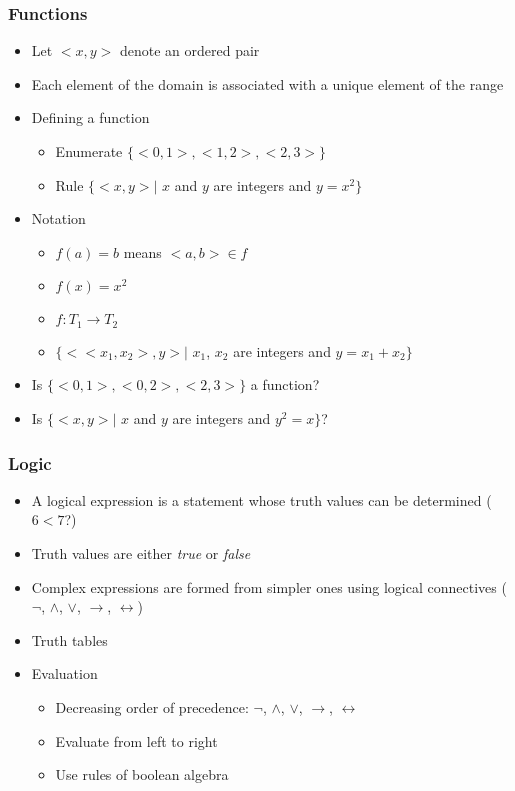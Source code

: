 \documentclass[t,12pt,numbers,fleqn]{beamer}
\begin{document}

\begin{frame}
\frametitle{Functions}
\begin{itemize}
\item Let $<x, y>$ denote an ordered pair
\item Each element of the domain is associated with a unique element
  of the range
\item Defining a function
\begin{itemize}
\item Enumerate $\{ <0, 1>, <1, 2>, <2, 3> \}$
\item Rule $\{ <x, y> |$ $x$ and $y$ are integers and $y = x^2 \}$
\end{itemize}
\item Notation
\begin{itemize}
\item $f(a) = b$ means $<a, b> \in f$
\item $f(x) = x^2$
\item $f: T_1 \rightarrow T_2$
\item $\{ <<x_1, x_2>, y> |$ $x_1$, $x_2$ are integers and $y = x_1 + x_2 \}$
\end{itemize}
\item Is $\{ <0, 1>, <0, 2>, <2, 3> \}$ a function?
\item Is $\{ <x, y> |$ $x$ and $y$ are integers and $y^2 = x\}$?
\end{itemize}
\end{frame}


\begin{frame}
\frametitle{Logic}
\begin{itemize}
\item A logical expression is a statement whose truth values can be
  determined ($6 < 7$?)
\item Truth values are either \emph{true} or \emph{false}
\item Complex expressions are formed from simpler ones using logical
  connectives ($\neg$, $\wedge$, $\vee$, $\rightarrow$,
  $\leftrightarrow$)
\item Truth tables
\item Evaluation
\begin{itemize}
\item Decreasing order of precedence: $\neg$, $\wedge$, $\vee$,
$\rightarrow$, $\leftrightarrow$
\item Evaluate from left to right
\item Use rules of boolean algebra
\end{itemize}
\end{itemize}
\end{frame}
\end{document}
